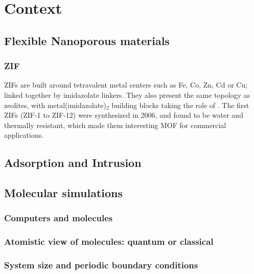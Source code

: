 \documentclass[thesis]{subfiles}
\begin{document}
\chapter{Context}
\startcontents[chapters]
\printpartialtoc

\section{Flexible Nanoporous materials}

\subsection{ZIF}

ZIFs are built around tetravalent metal centers such as Fe, Co, Zn, Cd or Cu;
linked together by imidazolate linkers.  They also present the same topology as
zeolites, with metal(imidazolate)$_2$ building blocks taking the role of
. The first ZIFs (ZIF-1 to ZIF-12) were synthesized in
2006\cite{Park2006}, and found to be water and thermally resistant, which made
them interesting MOF for commercial applications.

\section{Adsorption and Intrusion}

\section{Molecular simulations}

\subsection{Computers and molecules}

\subsection{Atomistic view of molecules: quantum or classical}

\subsection{System size and periodic boundary conditions}

\OnlyInSubfile{\printbibliography}
\end{document}
